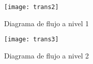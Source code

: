 \documentclass[conference]{IEEEtran}
\begin{document}
\begin{figure}[!h]
\centering
\texttt{[image: trans2]}
\caption{Diagrama de flujo a nivel 1}
\label{fig_sim}
\end{figure}
\vspace{0.1in}
\newpage
\begin{figure}[!h]
\centering
\texttt{[image: trans3]}
\caption{Diagrama de flujo a nivel 2}
\label{fig_sim}
\end{figure}
\vspace{0.1in}




%
%

\end{document}
